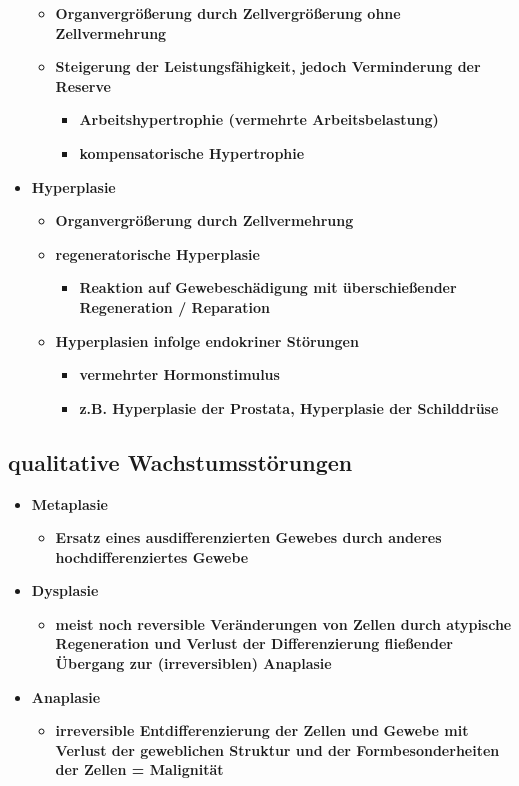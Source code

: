 \begin{itemize}
			\begin{itemize}
				\item \textbf{Organvergrößerung durch Zellvergrößerung ohne Zellvermehrung}
				\item \textbf{Steigerung der Leistungsfähigkeit, jedoch Verminderung der Reserve}
					\begin{itemize}
						\item \textbf{Arbeitshypertrophie (vermehrte Arbeitsbelastung)}
						\item \textbf{kompensatorische Hypertrophie}
					\end{itemize}
			\end{itemize}
		\item \textbf{Hyperplasie}
			\begin{itemize}
				\item \textbf{Organvergrößerung durch Zellvermehrung}
				\item \textbf{regeneratorische Hyperplasie}
					\begin{itemize}
						\item \textbf{Reaktion auf Gewebeschädigung mit überschießender Regeneration / Reparation}
					\end{itemize}
				\item \textbf{Hyperplasien infolge endokriner Störungen}
					\begin{itemize}
						\item \textbf{vermehrter Hormonstimulus}
						\item \textbf{z.B. Hyperplasie der Prostata, Hyperplasie der Schilddrüse}
					\end{itemize}
			\end{itemize}
	\end{itemize}

\subsection{qualitative Wachstumsstörungen}
	\begin{itemize}
		\item \textbf{Metaplasie}
			\begin{itemize}
				\item \textbf{Ersatz eines ausdifferenzierten Gewebes durch anderes hochdifferenziertes Gewebe}
			\end{itemize}
		\item \textbf{Dysplasie}
			\begin{itemize}
				\item \textbf{meist noch reversible Veränderungen von Zellen durch atypische Regeneration und Verlust der Differenzierung fließender Übergang zur (irreversiblen) Anaplasie}
			\end{itemize}
		\item \textbf{Anaplasie}
			\begin{itemize}
				\item \textbf{irreversible Entdifferenzierung der Zellen und Gewebe mit Verlust der geweblichen Struktur und der Formbesonderheiten der Zellen = Malignität}
			\end{itemize}
	\end{itemize}